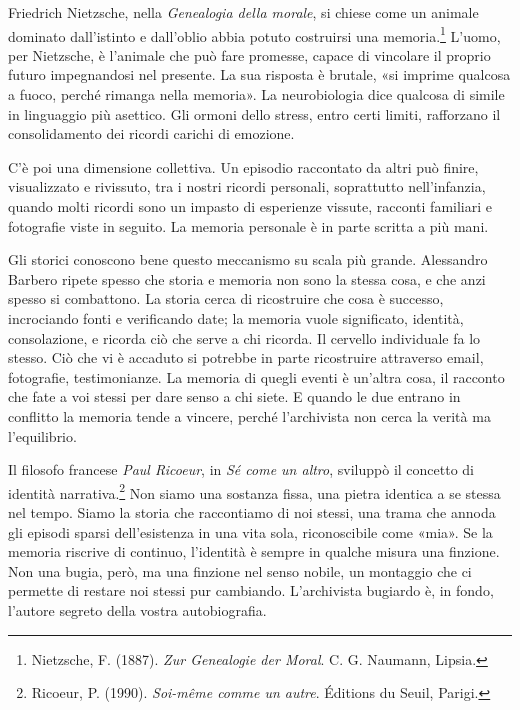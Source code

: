 Friedrich Nietzsche, nella \textit{Genealogia della morale}, si chiese come un animale dominato dall'istinto e dall'oblio abbia potuto costruirsi una memoria.\footnote{Nietzsche, F. (1887). \textit{Zur Genealogie der Moral}. C. G. Naumann, Lipsia.} L'uomo, per Nietzsche, è l'animale che può fare promesse, capace di vincolare il proprio futuro impegnandosi nel presente. La sua risposta è brutale, «si imprime qualcosa a fuoco, perché rimanga nella memoria». La neurobiologia dice qualcosa di simile in linguaggio più asettico. Gli ormoni dello stress, entro certi limiti, rafforzano il consolidamento dei ricordi carichi di emozione.

C'è poi una dimensione collettiva. Un episodio raccontato da altri può finire, visualizzato e rivissuto, tra i nostri ricordi personali, soprattutto nell'infanzia, quando molti ricordi sono un impasto di esperienze vissute, racconti familiari e fotografie viste in seguito. La memoria personale è in parte scritta a più mani.

Gli storici conoscono bene questo meccanismo su scala più grande. Alessandro Barbero ripete spesso che storia e memoria non sono la stessa cosa, e che anzi spesso si combattono. La storia cerca di ricostruire che cosa è successo, incrociando fonti e verificando date; la memoria vuole significato, identità, consolazione, e ricorda ciò che serve a chi ricorda. Il cervello individuale fa lo stesso. Ciò che vi è accaduto si potrebbe in parte ricostruire attraverso email, fotografie, testimonianze. La memoria di quegli eventi è un'altra cosa, il racconto che fate a voi stessi per dare senso a chi siete. E quando le due entrano in conflitto la memoria tende a vincere, perché l'archivista non cerca la verità ma l'equilibrio.

Il filosofo francese \textit{Paul Ricoeur}, in \textit{Sé come un altro}, sviluppò il concetto di identità narrativa.\footnote{Ricoeur, P. (1990). \textit{Soi-même comme un autre}. Éditions du Seuil, Parigi.} Non siamo una sostanza fissa, una pietra identica a se stessa nel tempo. Siamo la storia che raccontiamo di noi stessi, una trama che annoda gli episodi sparsi dell'esistenza in una vita sola, riconoscibile come «mia». Se la memoria riscrive di continuo, l'identità è sempre in qualche misura una finzione. Non una bugia, però, ma una finzione nel senso nobile, un montaggio che ci permette di restare noi stessi pur cambiando. L'archivista bugiardo è, in fondo, l'autore segreto della vostra autobiografia.

